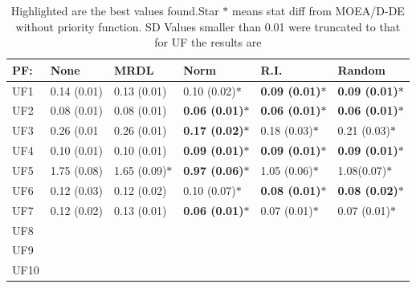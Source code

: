 \begin{table}[!t]
	\begin{tabular}{llllll}
		\cline{6-6}
		\hline
		\multicolumn{1}{|l|}{PF:}         & \multicolumn{1}{l|}{None} & \multicolumn{1}{l|}{MRDL} & \multicolumn{1}{l|}{Norm} & \multicolumn{1}{l|}{R.I.} & \multicolumn{1}{l|}{Random} \\ \hline \hline
		\multicolumn{1}{|l|}{UF1}              & \multicolumn{1}{l}{0.14 (0.01)} & \multicolumn{1}{l}{0.13 (0.01)} & \multicolumn{1}{l}{0.10 (0.02)$*$} & \textbf{0.09 (0.01)$*$}             & \textbf{0.09 (0.01)$*$} \\ \hline
		\multicolumn{1}{|l|}{UF2}              & \multicolumn{1}{l}{0.08 (0.01)} & \multicolumn{1}{l}{0.08 (0.01)} & \multicolumn{1}{l}{ \textbf{0.06 (0.01)$*$}} & \textbf{0.06 (0.01)$*$}             & \textbf{0.06 (0.01)$*$} \\ \hline
		\multicolumn{1}{|l|}{UF3}              & \multicolumn{1}{l}{0.26 (0.01} & \multicolumn{1}{l}{0.26 (0.01)} & \multicolumn{1}{l}{ \textbf{0.17 (0.02)}$*$} & 0.18 (0.03)$*$             &  0.21 (0.03)$*$ \\ \hline
		\multicolumn{1}{|l|}{UF4}              & \multicolumn{1}{l}{0.10 (0.01)} & \multicolumn{1}{l}{ 0.10 (0.01)} & \multicolumn{1}{l}{ \textbf{0.09 (0.01)}$*$} & \textbf{0.09 (0.01)$*$}             & \textbf{0.09 (0.01)$*$} \\ \hline
		\multicolumn{1}{|l|}{UF5}              & \multicolumn{1}{l}{1.75 (0.08)} & \multicolumn{1}{l}{1.65 (0.09)$*$} & \multicolumn{1}{l}{ \textbf{0.97 (0.06)$*$}} & 1.05 (0.06)$*$            & 1.08(0.07)$*$ \\ \hline
		\multicolumn{1}{|l|}{UF6}              & \multicolumn{1}{l}{0.12 (0.03)} & \multicolumn{1}{l}{0.12 (0.02)} & \multicolumn{1}{l}{ 0.10 (0.07)$*$} & \textbf{0.08 (0.01)$*$}            & \textbf{0.08 (0.02)$*$} \\ \hline		
		\multicolumn{1}{|l|}{UF7}              & \multicolumn{1}{l}{0.12 (0.02)} & \multicolumn{1}{l}{0.13 (0.01)} & \multicolumn{1}{l}{ \textbf{0.06 (0.01)$*$}} & 0.07 (0.01)$*$             & 0.07 (0.01)$*$ \\ \hline
		UF8                                           &                          &                          &                          &                           &                             \\
		UF9                                           &                          &                          &                          &                           &                             \\
		UF10                                          &                          &                          &                          &                           &                            
	\end{tabular}
	\caption{Highlighted are the best values found.Star $*$ means stat diff from MOEA/D-DE without priority function. SD Values smaller than 0.01 were truncated to that\\ for UF the results are}
		\label{table_igd}
\end{table}


